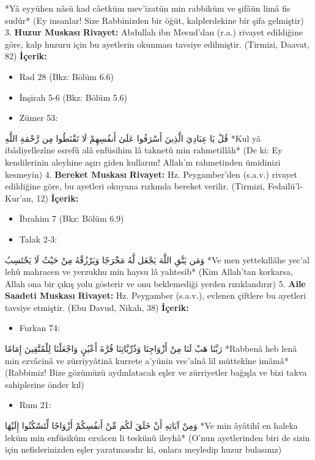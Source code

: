 \documentclass[12pt,a4paper]{article}
\begin{document}
*Yâ eyyühen nâsü kad câetküm mev'izatün min rabbiküm ve şifâün limâ fis sudûr*
(Ey insanlar! Size Rabbinizden bir öğüt, kalplerdekine bir şifa gelmiştir)
3. \textbf{Huzur Muskası}
\textbf{Rivayet:} Abdullah ibn Mesud'dan (r.a.) rivayet edildiğine göre, kalp huzuru için bu ayetlerin okunması tavsiye edilmiştir. (Tirmizi, Daavat, 82)
\textbf{İçerik:}
\begin{itemize}
\item Rad 28 (Bkz: Bölüm 6.6)
\item İnşirah 5-6 (Bkz: Bölüm 5.6)
\item Zümer 53:
\end{itemize}
قُلْ يَا عِبَادِيَ الَّذِينَ أَسْرَفُوا عَلَىٰ أَنفُسِهِمْ لَا تَقْنَطُوا مِن رَّحْمَةِ اللَّهِ
*Kul yâ ibâdiyellezîne esrefû alâ enfüsihim lâ taknetû min rahmetillâh*
(De ki: Ey kendilerinin aleyhine aşırı giden kullarım! Allah'ın rahmetinden ümidinizi kesmeyin)
4. \textbf{Bereket Muskası}
\textbf{Rivayet:} Hz. Peygamber'den (s.a.v.) rivayet edildiğine göre, bu ayetleri okuyana rızkında bereket verilir. (Tirmizi, Fedailü'l-Kur'an, 12)
\textbf{İçerik:}
\begin{itemize}
\item İbrahim 7 (Bkz: Bölüm 6.9)
\item Talak 2-3:
\end{itemize}
وَمَن يَتَّقِ اللَّهَ يَجْعَل لَّهُ مَخْرَجًا وَيَرْزُقْهُ مِنْ حَيْثُ لَا يَحْتَسِبُ
*Ve men yettekıllâhe yec'al lehû mahracen ve yerzukhu min haysu lâ yahtesib*
(Kim Allah'tan korkarsa, Allah ona bir çıkış yolu gösterir ve onu beklemediği yerden rızıklandırır)
5. \textbf{Aile Saadeti Muskası}
\textbf{Rivayet:} Hz. Peygamber (s.a.v.), evlenen çiftlere bu ayetleri tavsiye etmiştir. (Ebu Davud, Nikah, 38)
\textbf{İçerik:}
\begin{itemize}
\item Furkan 74:
\end{itemize}
رَبَّنَا هَبْ لَنَا مِنْ أَزْوَاجِنَا وَذُرِّيَّاتِنَا قُرَّةَ أَعْيُنٍ وَاجْعَلْنَا لِلْمُتَّقِينَ إِمَامًا
*Rabbenâ heb lenâ min ezvâcinâ ve zürriyyâtinâ kurrete a'yünin vec'alnâ lil müttekîne imâmâ*
(Rabbimiz! Bize gözümüzü aydınlatacak eşler ve zürriyetler bağışla ve bizi takva sahiplerine önder kıl)
\begin{itemize}
\item Rum 21:
\end{itemize}
وَمِنْ آيَاتِهِ أَنْ خَلَقَ لَكُم مِّنْ أَنفُسِكُمْ أَزْوَاجًا لِّتَسْكُنُوا إِلَيْهَا
*Ve min âyâtihî en haleka leküm min enfüsiküm ezvâcen li teskünû ileyhâ*
(O'nun ayetlerinden biri de sizin için nefislerinizden eşler yaratmasıdır ki, onlara meyledip huzur bulasınız)
\end{document}

